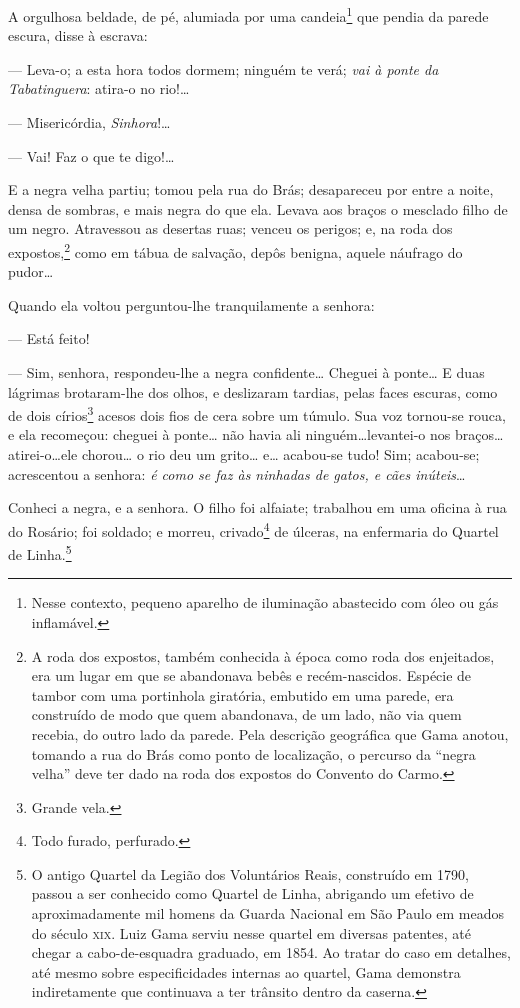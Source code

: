 {A orgulhosa beldade, de pé, alumiada por uma candeia\footnote{Nesse
  contexto, pequeno aparelho de iluminação abastecido com óleo ou gás
  inflamável.} que pendia da parede escura, disse à escrava:

  --- Leva-o; a esta hora todos dormem; ninguém te verá; \emph{vai à
  ponte da Tabatinguera}: atira-o no rio!\ldots{}

  --- Misericórdia, \emph{Sinhora}!\ldots{}

  --- Vai! Faz o que te digo!\ldots{}

E a negra velha partiu; tomou pela rua do Brás; desapareceu por entre a
noite, densa de sombras, e mais negra do que ela. Levava aos braços o
mesclado filho de um negro. Atravessou as desertas ruas; venceu os
perigos; e, na roda dos expostos,\footnote{A roda dos expostos, também
  conhecida à época como roda dos enjeitados, era um lugar em que se
  abandonava bebês e recém-nascidos. Espécie de tambor com uma
  portinhola giratória, embutido em uma parede, era construído de modo
  que quem abandonava, de um lado, não via quem recebia, do outro lado
  da parede. Pela descrição geográfica que Gama anotou, tomando a rua do
  Brás como ponto de localização, o percurso da ``negra velha'' deve ter
  dado na roda dos expostos do Convento do Carmo.} como em tábua de
salvação, depôs benigna, aquele náufrago do pudor\ldots{}

  Quando ela voltou perguntou-lhe tranquilamente a senhora:

  --- Está feito! %

--- Sim, senhora, respondeu-lhe a negra confidente\ldots{} Cheguei à
ponte\ldots{} E duas lágrimas brotaram-lhe dos olhos, e deslizaram tardias,
pelas faces escuras, como de dois círios\footnote{Grande vela.} acesos
dois fios de cera sobre um túmulo. Sua voz tornou-se rouca, e ela
recomeçou: cheguei à ponte\ldots{} não havia ali ninguém\ldots{}levantei-o nos
braços\ldots{}atirei-o\ldots{}ele chorou\ldots{} o rio deu um grito\ldots{} e\ldots{} acabou-se
tudo! Sim; acabou-se; acrescentou a senhora: \emph{é como se faz às
ninhadas de gatos, e cães inúteis}\ldots{}

Conheci a negra, e a senhora. O filho foi alfaiate; trabalhou em uma
oficina à rua do Rosário; foi soldado; e morreu, crivado\footnote{Todo
  furado, perfurado.} de úlceras, na enfermaria do Quartel de
Linha.\footnote{O antigo Quartel da Legião dos Voluntários Reais,
  construído em 1790, passou a ser conhecido como Quartel de Linha,
  abrigando um efetivo de aproximadamente mil homens da Guarda Nacional
  em São Paulo em meados do século \textsc{xix}. Luiz Gama serviu nesse quartel
  em diversas patentes, até chegar a cabo-de-esquadra graduado, em 1854.
  Ao tratar do caso em detalhes, até mesmo sobre especificidades
  internas ao quartel, Gama demonstra indiretamente que continuava a ter
  trânsito dentro da caserna.}

}
